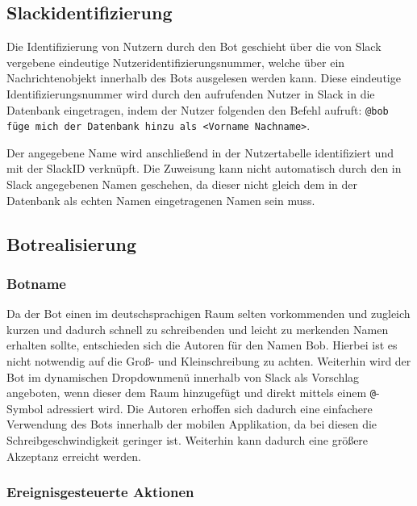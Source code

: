 



\subsection{Slackidentifizierung}

Die Identifizierung von Nutzern durch den Bot geschieht über die von Slack vergebene eindeutige Nutzeridentifizierungsnummer, welche über ein Nachrichtenobjekt innerhalb des Bots ausgelesen werden kann. Diese eindeutige Identifizierungsnummer wird durch den aufrufenden Nutzer in Slack in die Datenbank eingetragen, indem der Nutzer folgenden den Befehl aufruft: 
\texttt{@bob füge mich der Datenbank hinzu als <Vorname Nachname>}.

Der angegebene Name wird anschließend in der Nutzertabelle identifiziert und mit der SlackID verknüpft. Die Zuweisung kann nicht automatisch durch den in Slack angegebenen Namen geschehen, da dieser nicht gleich dem in der Datenbank als echten Namen eingetragenen Namen sein muss.



\subsection{Botrealisierung}
\subsubsection{Botname}
Da der Bot einen im deutschsprachigen Raum selten vorkommenden und zugleich kurzen und dadurch schnell zu schreibenden und leicht zu merkenden Namen erhalten sollte, entschieden sich die Autoren für den Namen Bob. Hierbei ist es nicht notwendig auf die Groß- und Kleinschreibung zu achten. Weiterhin wird der Bot im dynamischen Dropdownmenü innerhalb von Slack als Vorschlag angeboten, wenn dieser dem Raum hinzugefügt und direkt mittels einem \texttt{@}-Symbol adressiert wird. Die Autoren erhoffen sich dadurch eine einfachere Verwendung des Bots innerhalb der mobilen Applikation, da bei diesen die Schreibgeschwindigkeit geringer ist. Weiterhin kann dadurch eine größere Akzeptanz erreicht werden.

\subsubsection{Ereignisgesteuerte Aktionen}


